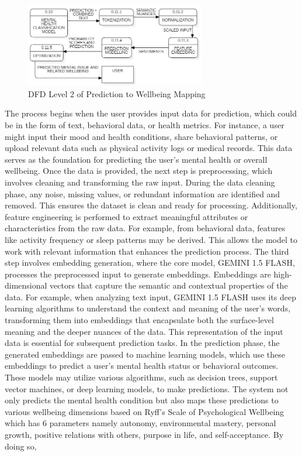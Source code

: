 \begin{figure}[h!]  
    \centering
    \includegraphics[width=0.7\textwidth]{Images/DFD L2 MW.png}  
    \caption{DFD Level 2 of Prediction to Wellbeing Mapping}
    \label{dfdl166}  %
\end{figure}

\noindent
The process begins when the user provides input data for prediction, which could be in the form of text, behavioral data, or health metrics. For instance, a user might input their mood and health conditions, share behavioral patterns, or upload relevant data such as physical activity logs or medical records. This data serves as the foundation for predicting the user's mental health or overall wellbeing. Once the data is provided, the next step is preprocessing, which involves cleaning and transforming the raw input. During the data cleaning phase, any noise, missing values, or redundant information are identified and removed. This ensures the dataset is clean and ready for processing. Additionally, feature engineering is performed to extract meaningful attributes or characteristics from the raw data. For example, from behavioral data, features like activity frequency or sleep patterns may be derived. This allows the model to work with relevant information that enhances the prediction process. The third step involves embedding generation, where the core model, GEMINI 1.5 FLASH, processes the preprocessed input to generate embeddings. Embeddings are high-dimensional vectors that capture the semantic and contextual properties of the data. For example, when analyzing text input, GEMINI 1.5 FLASH uses its deep learning algorithms to understand the context and meaning of the user's words, transforming them into embeddings that encapsulate both the surface-level meaning and the deeper nuances of the data. This representation of the input data is essential for subsequent prediction tasks. In the prediction phase, the generated embeddings are passed to machine learning models, which use these embeddings to predict a user's mental health status or behavioral outcomes. These models may utilize various algorithms, such as decision trees, support vector machines, or deep learning models, to make predictions. The system not only predicts the mental health condition but also maps these predictions to various wellbeing dimensions based on Ryff's Scale of Psychological Wellbeing which has 6 parameters namely autonomy, environmental mastery, personal growth, positive relations with others, purpose in life, and self-acceptance. By doing so, 